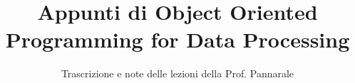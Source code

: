\documentclass[a4paper,12pt]{article}
\title{Appunti di Object Oriented Programming for Data Processing}
\author{Trascrizione e note delle lezioni della Prof. Pannarale}
\date{}
\begin{document}
\maketitle
\projectintro
\tableofcontents
\newpage

\end{document}
